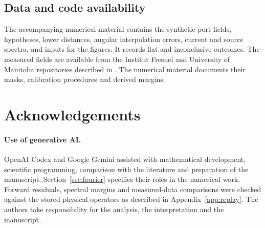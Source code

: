 \documentclass[anonymous,12pt]{iopjournal}
\numberwithin{equation}{section}
\begin{document}
\subsection*{Data and code availability}
The accompanying numerical material contains the synthetic port fields, hypotheses, lower distances, angular interpolation errors, current and source spectra, and inputs for the figures. It records flat and inconclusive outcomes. The measured fields are available from the Institut Fresnel and University of Manitoba repositories described in \cite{fresnel,manitoba}. The numerical material documents their masks, calibration procedures and derived margins.

\section*{Acknowledgements}
\paragraph{Use of generative AI.} OpenAI Codex and Google Gemini assisted with mathematical development, scientific programming, comparison with the literature and preparation of the manuscript. Section~\ref{sec:fourier} specifies their roles in the numerical work. Forward residuals, spectral margins and measured-data comparisons were checked against the stored physical operators as described in Appendix~\ref{app:replay}. The authors take responsibility for the analysis, the interpretation and the manuscript.


\FloatBarrier
\begingroup\small

\endgroup
\end{document}
